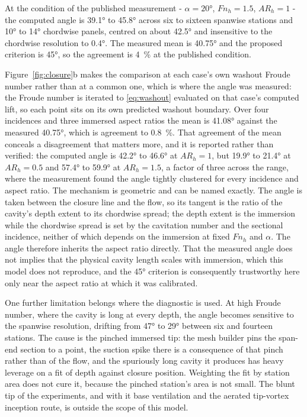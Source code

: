 \documentclass[11pt,a4paper]{article}
\newcommand{\Fnh}{\mathit{Fn}_h}
\newcommand{\ARh}{\mathit{AR}_h}
\begin{document}
At the condition of the published measurement - $\alpha = \ang{20}$,
$\Fnh = 1.5$, $\ARh = 1$ - the computed angle is \ang{39.1} to \ang{45.8} across
six to sixteen spanwise stations and \ang{10} to \ang{14} chordwise panels,
centred on about \ang{42.5} and insensitive to the chordwise resolution to
\ang{0.4}. The measured mean is \ang{40.75} and the proposed criterion is
\ang{45}, so the agreement is \SI{4}{\percent} at the published condition.

Figure~\ref{fig:closure}b makes the comparison at each case's own washout Froude
number rather than at a common one, which is where the angle was measured: the
Froude number is iterated to \eqref{eq:washout} evaluated on that case's computed
lift, so each point sits on its own predicted washout boundary. Over four
incidences and three immersed aspect ratios the mean is \ang{41.08} against the
measured \ang{40.75}, which is agreement to \SI{0.8}{\percent}. That agreement of
the mean conceals a disagreement that matters more, and it is reported rather than
verified: the computed angle is \ang{42.2} to \ang{46.6} at $\ARh = 1$, but
\ang{19.9} to \ang{21.4} at $\ARh = 0.5$ and \ang{57.4} to \ang{59.9} at
$\ARh = 1.5$, a factor of three across the range, where the measurement found the
angle tightly clustered for every incidence and aspect ratio. The mechanism is
geometric and can be named exactly. The angle is taken between the closure line
and the flow, so its tangent is the ratio of the cavity's depth extent to its
chordwise spread; the depth extent is the immersion while the chordwise spread is
set by the cavitation number and the sectional incidence, neither of which depends
on the immersion at fixed $\Fnh$ and $\alpha$. The angle therefore inherits the
aspect ratio directly. That the measured angle does not implies that the physical
cavity length scales with immersion, which this model does not reproduce, and the
\ang{45} criterion is consequently trustworthy here only near the aspect ratio at
which it was calibrated.

One further limitation belongs where the diagnostic is used. At high Froude
number, where the cavity is long at every depth, the angle becomes sensitive to
the spanwise resolution, drifting from \ang{47} to \ang{29} between six and
fourteen stations. The cause is the pinched immersed tip: the mesh builder pins
the span-end section to a point, the suction spike there is a consequence of that
pinch rather than of the flow, and the spuriously long cavity it produces has
heavy leverage on a fit of depth against closure position. Weighting the fit by
station area does not cure it, because the pinched station's area is not small.
The blunt tip of the experiments, and with it base ventilation and the aerated
tip-vortex inception route, is outside the scope of this model.
\end{document}
